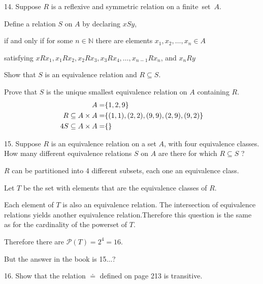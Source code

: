 \documentclass{idrisMemo}
\begin{document}
\begin{prooflist}{14. Suppose $R$ is a reflexive and symmetric relation on a
    \mbox{finite set $A$.}}
\item Define a relation $S$ on $A$ by declaring $x S y$,
\item if and only if for some $n \in \mathbb{N}$ there are elements $x_1, x_2, \ldots, x_n \in A$
\item satisfying $x R x_1, x_1 R x_2, x_2 R x_3, x_3 R x_4, \ldots, x_{n-1} R x_n$, and $x_n R y$
\item Show that $S$ is an equivalence relation and $R \subseteq S$.
\item Prove that $S$ is the unique smallest equivalence relation on $A$ containing $R$.
    \begin{align*}
        A=&\{1, 2, 9\}\\
        R\subseteq A\times A=&\{(1, 1), (2, 2), (9, 9), (2, 9), (9, 2)\}\\
        4S\subseteq A\times A=&\{\}
    \end{align*}
\end{prooflist}

\begin{prooflist}{15. Suppose $R$ is an equivalence relation on a set $A$, with
four equivalence classes. How many different equivalence relations $S$ on $A$
are there for which $R \subseteq S$ ?}
\item $R$ can be partitioned into 4 different subsets, each one an equivalence
    class.
\item Let $T$ be the set with elements that are the equivalence classes of $R$.
\item Each element of $T$ is also an equivalence relation. The
    intersection of equivalence relations yields another equivalence
    relation.Therefore this question is the same as for the cardinality of the
    powerset of $T$.
\item Therefore there are $\mathscr{P}(T) = 2^4 = 16$.
\item But the answer in the book is 15...?
\end{prooflist}

\begin{prooflist}{16. Show that the relation $\doteq$ defined on page 213 is
transitive.} \item \end{prooflist}
\end{document}
